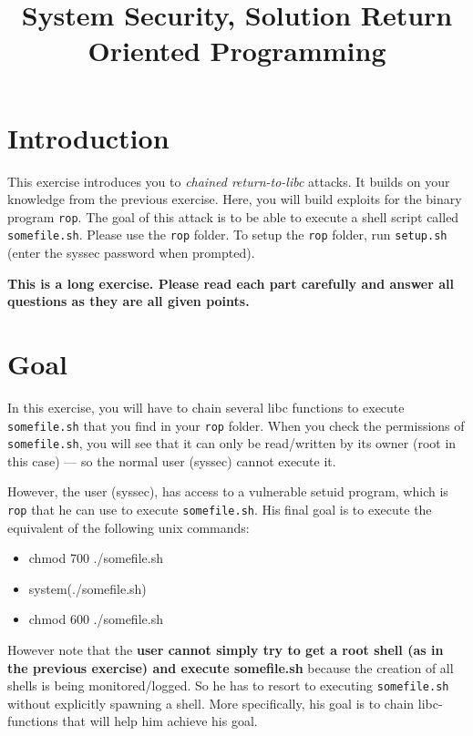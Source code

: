 \documentclass[a4paper,11pt]{article}
\title{System Security,
\ifsolution Solution \else \fi
Return Oriented Programming}
\begin{document}
\maketitle


\section*{Introduction}

This exercise introduces you to \textit{chained return-to-libc} attacks. It
builds on your knowledge from the previous exercise. Here, you will build
exploits for the binary program {\tt rop}.  The goal of this attack is to be
able to execute a shell script called {\tt somefile.sh}. Please use the
\texttt{rop} folder. To setup the \texttt{rop} folder, run
\texttt{setup.sh} (enter the syssec password when prompted).

\textbf{This is a long exercise. Please read each part carefully and answer all
  questions as they are all given points.}


\section{Goal}
In this exercise, you will have to chain several libc functions
to execute \texttt{somefile.sh} that you find in your \texttt{rop} folder. 
When you check the permissions of \texttt{somefile.sh}, you will see that it
can only be read/written by its owner (root in this case) --- so the normal user
(syssec) cannot execute it. 

However, the user (syssec), has access to a vulnerable setuid program, which is
\texttt{rop} that he can use to execute \texttt{somefile.sh}. His final goal is
to execute the equivalent of the following unix commands:

\begin{itemize}
\item chmod 700 ./somefile.sh
\item system(./somefile.sh)
\item chmod 600 ./somefile.sh
\end{itemize}

However note that the \textbf{user cannot simply try to get a root shell (as in the
previous exercise) and execute somefile.sh} because the creation of all shells is
being monitored/logged. So he has to resort to executing \texttt{somefile.sh}
without explicitly spawning a shell. More specifically, his goal is to chain
libc-functions that will help him achieve his goal.
\end{document}
